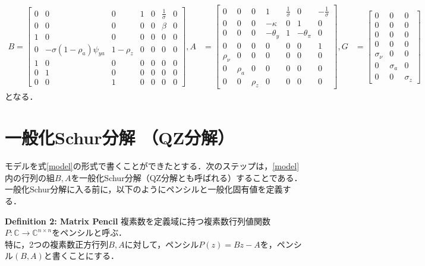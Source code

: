 \documentclass[a4j, dvipdfmx]{jarticle}
\begin{document}
\begin{align}
B = \begin{bmatrix}
0 & 0 & 0 & 1 & 0 & \frac{1}{\sigma} & 0 \\
0 & 0 & 0 & 0 & 0 & \beta & 0 \\
1 & 0 & 0 & 0 & 0 & 0 & 0 \\
0 & -\sigma(1-\rho_a) \psi_{ya} & 1-\rho_z & 0 & 0 & 0 & 0 \\
1 & 0 & 0 & 0 & 0 & 0 & 0 \\
0 & 1 & 0 & 0 & 0 & 0 & 0 \\
0 & 0 & 1 & 0 & 0 & 0 & 0 
\end{bmatrix},
A &= \begin{bmatrix}
0 & 0 & 0 & 1 & \frac{1}{\sigma} & 0 & -\frac{1}{\sigma} \\
0 & 0 & 0 & -\kappa & 0 & 1 & 0 \\
0 & 0 & 0 & -\theta_y & 1 & -\theta_\pi & 0 \\
0 & 0 & 0 & 0 & 0 & 0 & 1 \\
\rho_\nu & 0 & 0 & 0 & 0 & 0 & 0\\
0 & \rho_a & 0 & 0 & 0 & 0 & 0 \\
0 & 0 & \rho_z & 0 & 0 & 0 & 0
\end{bmatrix},
G &= \begin{bmatrix}0 & 0 & 0 \\
0 & 0 & 0 \\
0 & 0 & 0 \\
0 & 0 & 0 \\
\sigma_\nu & 0 & 0 \\
0 & \sigma_a & 0 \\
0 & 0 & \sigma_z
\end{bmatrix}
\end{align}
となる．

\section{一般化Schur分解 （QZ分解）}
モデルを式\eqref{model}の形式で書くことができたとする．次のステップは，\eqref{model}内の行列の組$B, A$を一般化Schur分解（QZ分解とも呼ばれる）することである．一般化Schur分解に入る前に，以下のようにペンシルと一般化固有値を定義する．\\

\begin{itembox}[l]{{\bf Definition 2: Matrix Pencil}}
複素数を定義域に持つ複素数行列値関数$P: \mathbb{C}\to \mathbb{C}^{n\times n}$をペンシルと呼ぶ．\\
特に，2つの複素数正方行列$B, A$に対して，ペンシル$P(z) = Bz - A$を，ペンシル$(B,A)$と書くことにする．
\end{itembox}
\\
\end{document}
